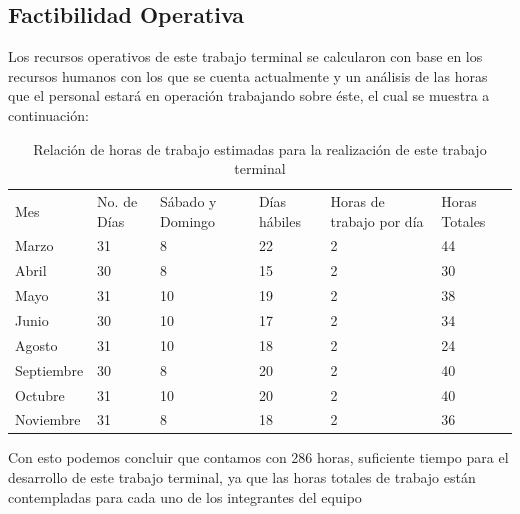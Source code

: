 \documentclass[12pt, a4paper, titlepage]{report}
\begin{document}
    	\subsection{Factibilidad Operativa}
    	Los recursos operativos de este trabajo terminal se calcularon con base en los recursos humanos con los que se cuenta actualmente y un análisis de las horas que el personal estará en operación trabajando sobre éste, el cual se muestra a continuación:
    	
    	\begin{table}[H]
    		\begin{tabular}{|p{1.7cm}|p{1.6cm}|p{1.6cm}|p{1.6cm}|p{1.6cm}|p{1.6cm}|}
    			\hline
    			\rowcolor{guindapoli}
    			\multicolumn{6}{|c|}{\textbf{\textcolor{white}{Horas a trabajar en el desarrollo del trabajo terminal}}}\\
    			\hline
    			\rowcolor{azulfuerte}Mes & No. de Días & Sábado y Domingo & Días h\'abiles & Horas de trabajo por día & Horas Totales \\
    			\hline
    			\cellcolor{azulclaro}Marzo & 31 & 8 & 22 & 2 & 44 \\ 
    			\hline
    			\cellcolor{azulclaro}Abril & 30 & 8 & 15 & 2 & 30 \\ 
    			\hline
    			\cellcolor{azulclaro}Mayo & 31 & 10 & 19 & 2 & 38 \\
    			\hline
    			\cellcolor{azulclaro}Junio & 30 & 10 & 17 & 2 & 34 \\
    			\hline
    			\cellcolor{azulclaro}Agosto & 31 & 10 & 18 & 2 & 24 \\
    			\hline
    			\cellcolor{azulclaro}Septiembre & 30 & 8 & 20 & 2 & 40 \\ 
    			\hline
    			\cellcolor{azulclaro}Octubre & 31 & 10 & 20 & 2 & 40 \\ 
    			\hline
    			\cellcolor{azulclaro}Noviembre & 31 & 8 & 18 & 2 & 36 \\ 
    			\hline
    		\end{tabular}
    		\caption[Horas de trabajo]{Relación de horas de trabajo estimadas para la realización de este trabajo terminal}
    	\end{table}
    	Con esto podemos concluir que contamos con 286 horas, suficiente tiempo para el desarrollo de este trabajo terminal, ya que las horas totales de trabajo están contempladas para cada uno de los integrantes del equipo
    	
\end{document}
